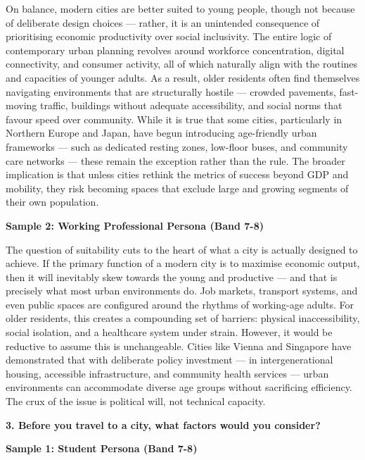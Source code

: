On balance, modern cities are better suited to young people, though not because of deliberate design choices — rather, it is an unintended consequence of prioritising economic productivity over social inclusivity. The entire logic of contemporary urban planning revolves around workforce concentration, digital connectivity, and consumer activity, all of which naturally align with the routines and capacities of younger adults. As a result, older residents often find themselves navigating environments that are structurally hostile — crowded pavements, fast-moving traffic, buildings without adequate accessibility, and social norms that favour speed over community. While it is true that some cities, particularly in Northern Europe and Japan, have begun introducing age-friendly urban frameworks — such as dedicated resting zones, low-floor buses, and community care networks — these remain the exception rather than the rule. The broader implication is that unless cities rethink the metrics of success beyond GDP and mobility, they risk becoming spaces that exclude large and growing segments of their own population.

\textbf{Sample 2: Working Professional Persona (Band 7-8)}

The question of suitability cuts to the heart of what a city is actually designed to achieve. If the primary function of a modern city is to maximise economic output, then it will inevitably skew towards the young and productive — and that is precisely what most urban environments do. Job markets, transport systems, and even public spaces are configured around the rhythms of working-age adults. For older residents, this creates a compounding set of barriers: physical inaccessibility, social isolation, and a healthcare system under strain. However, it would be reductive to assume this is unchangeable. Cities like Vienna and Singapore have demonstrated that with deliberate policy investment — in intergenerational housing, accessible infrastructure, and community health services — urban environments can accommodate diverse age groups without sacrificing efficiency. The crux of the issue is political will, not technical capacity.

\separator

\begin{ieltsquestion}
\textbf{3. Before you travel to a city, what factors would you consider?}
\end{ieltsquestion}
\textbf{Sample 1: Student Persona (Band 7-8)}

